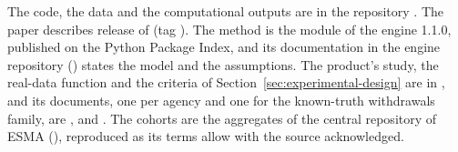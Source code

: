The code, the data and the computational outputs are in the repository . The paper describes release \docversion{} of  (tag \texttt{\docversion}). The method is the module  of the engine  1.1.0, published on the Python Package Index, and its documentation in the engine repository () states the model and the assumptions. The product's study, the real-data function and the criteria of Section~\ref{sec:experimental-design} are in , and its documents, one per agency and one for the known-truth withdrawals family, are ,  and . The cohorts are the aggregates of the central repository of ESMA (), reproduced as its terms allow with the source acknowledged. %

